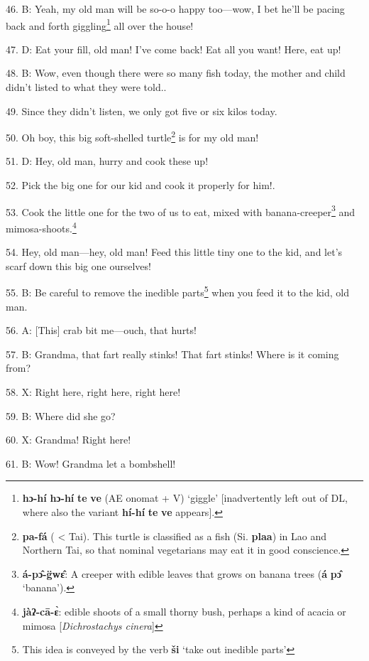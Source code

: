 46. B: Yeah, my old man will be so-o-o happy too---wow, I bet he'll be pacing back
and forth giggling\footnote{\textbf{hɔ-hí} \textbf{hɔ-hí} \textbf{te} \textbf{ve} (AE onomat + V) `giggle' [inadvertently left out of DL, where also the variant \textbf{hí-hí} \textbf{te} \textbf{ve} appears].} all over the house! 

47. D:  Eat your fill, old man! I've come
back! Eat all you want! Here, eat up!

48. B: Wow, even though there were so many fish today, the mother and child didn't
listed to what they were told..

49. Since they didn't listen, we only got five or six kilos today.

50. Oh boy, this big soft-shelled turtle\footnote{\textbf{pa-fá} ( < Tai). This turtle is classified as a fish (Si. \textbf{plaa}) in Lao and Northern Tai, so that nominal vegetarians may eat it in good conscience.} is for my old man!

51. D: Hey, old man, hurry and cook these up!

52. Pick the big one for our kid and cook it properly for him!.

53. Cook the little one for the two of us to eat, mixed with banana-creeper\footnote{\textbf{á-pɔ̂-g̈wɛ̂}: A creeper with edible leaves that grows on banana trees (\textbf{á} \textbf{pɔ̂} `banana').}
and mimosa-shoots.\footnote{\textbf{jàʔ-cā-ɛ̀}: edible shoots of a small thorny bush, perhaps a kind of acacia or mimosa [\textit{Dichrostachys cinera}]}

54.  Hey, old man---hey, old man!
Feed this little tiny one to the kid, and let's scarf down this big one ourselves!

55. B: Be careful to remove the inedible parts\footnote{This idea is conveyed by the verb \textbf{ši} `take out inedible parts'} when you feed it to the kid,
old man.

56. A: [This] crab bit me---ouch, that hurts!

57. B: Grandma, that fart really stinks! That fart stinks! Where is it coming from?

58. X: Right here, right here, right here!

59. B: Where did she go?

60. X: Grandma! Right here!

61. B: Wow! Grandma let a bombshell!

